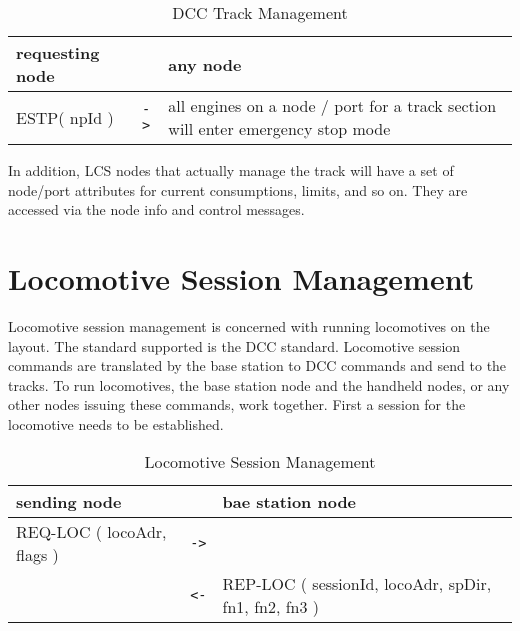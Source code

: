 \begin{table}[ht!]
    \begin{center}
        \caption{DCC Track Management}
        \begin{tabular}{|p{}| c |p{}|}
            \toprule
            \textbf{requesting node} & & \textbf{ any node} \\
            \midrule
            ESTP( npId ) & \texttt{->} & all engines on a node / port for a track section will enter emergency stop mode  \\
            \bottomrule
        \end{tabular}
    \end{center}
\end{table}

In addition, LCS nodes that actually manage the track will have a set of node/port attributes for current consumptions, limits, and so on. They are accessed via the node info and control messages.

\section{Locomotive Session Management}

Locomotive session management is concerned with running locomotives on the layout. The standard supported is the DCC standard. Locomotive session commands are translated by the base station to DCC commands and send to the tracks. To run locomotives, the base station node and the handheld nodes, or any other nodes issuing these commands,  work together. First a session for the locomotive needs to be established.

\begin{table}[ht!]
    \begin{center}
        \caption{Locomotive Session Management}
        \begin{tabular}{|p{}| c |p{}|}
            \toprule
            \textbf{sending node} & & \textbf{ bae station node} \\
            \midrule
            REQ-LOC ( locoAdr, flags ) & \texttt{->} &  \\
            \midrule
            & \texttt{<-} & REP-LOC ( sessionId, locoAdr, spDir, fn1, fn2, fn3 ) \\
            \bottomrule
        \end{tabular}
    \end{center}
\end{table}

